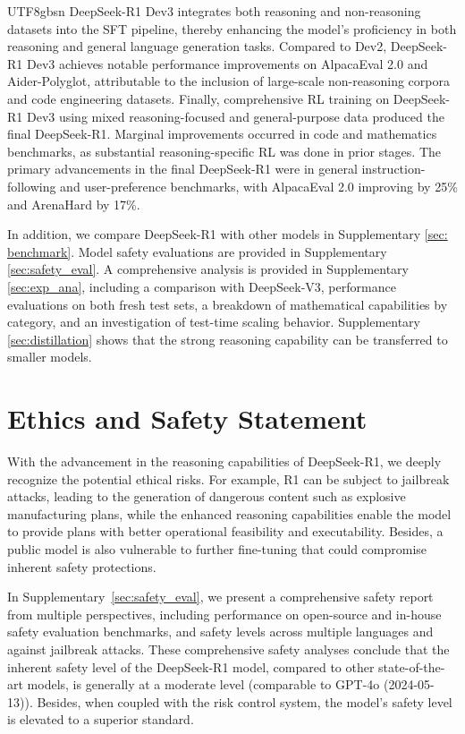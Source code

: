 \documentclass[11pt, a4paper, logo, copyright, nonumbering]{deepseek}
\begin{document}
\begin{CJK*}{UTF8}{gbsn}
 DeepSeek-R1 Dev3 integrates both reasoning and non-reasoning datasets into the SFT pipeline, thereby enhancing the model’s proficiency in both reasoning and general language generation tasks. Compared to Dev2, DeepSeek-R1 Dev3 achieves notable performance improvements on AlpacaEval 2.0 and Aider-Polyglot, attributable to the inclusion of large-scale non-reasoning corpora and code engineering datasets. Finally, comprehensive RL training on DeepSeek-R1 Dev3 using mixed reasoning-focused and general-purpose data produced the final DeepSeek-R1. Marginal improvements occurred in code and mathematics benchmarks, as substantial reasoning-specific RL was done in prior stages. The primary advancements in the final DeepSeek-R1 were in general instruction-following and user-preference benchmarks, with AlpacaEval 2.0 improving by 25\% and ArenaHard by 17\%.



    In addition, we compare DeepSeek-R1 with other models in Supplementary \ref{sec: benchmark}. Model safety evaluations are provided in Supplementary \ref{sec:safety_eval}. 
    A comprehensive analysis is provided in Supplementary \ref{sec:exp_ana}, including a comparison with DeepSeek-V3, performance evaluations on both fresh test sets, a breakdown of mathematical capabilities by category, and an investigation of test-time scaling behavior. Supplementary \ref{sec:distillation} shows that the strong reasoning capability can be transferred to smaller models. 



\section{Ethics and Safety Statement}
With the advancement in the reasoning capabilities of DeepSeek-R1, we deeply recognize the potential ethical risks. For example, R1 can be subject to jailbreak attacks, leading to the generation of dangerous content such as explosive manufacturing plans, while the enhanced reasoning capabilities enable the model to provide plans with better operational feasibility and executability.
 Besides, a public model is also vulnerable to further fine-tuning that could compromise inherent safety protections.
 
In Supplementary~\ref{sec:safety_eval}, we present a comprehensive safety report from multiple perspectives, including performance on open-source and in-house safety evaluation benchmarks, and safety levels across multiple languages and against jailbreak attacks. These comprehensive safety analyses conclude that the inherent safety level of the DeepSeek-R1 model, compared to other state-of-the-art models, is generally at a moderate level (comparable to GPT-4o (2024-05-13)). Besides, when coupled with the risk control system, the model's safety level is elevated to a superior standard.



\end{CJK*}
\end{document}
